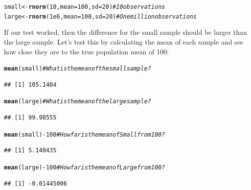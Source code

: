 \documentclass{tufte-book}\usepackage[]{graphicx}\usepackage[]{color}
\makeatletter
\newcommand{\hlnum}[1]{\textcolor[rgb]{0.686,0.059,0.569}{#1}}%
\newcommand{\hlcom}[1]{\textcolor[rgb]{0.678,0.584,0.686}{\textit{#1}}}%
\newcommand{\hlopt}[1]{\textcolor[rgb]{0,0,0}{#1}}%
\newcommand{\hlstd}[1]{\textcolor[rgb]{0.345,0.345,0.345}{#1}}%
\newcommand{\hlkwb}[1]{\textcolor[rgb]{0.69,0.353,0.396}{#1}}%
\newcommand{\hlkwc}[1]{\textcolor[rgb]{0.333,0.667,0.333}{#1}}%
\newcommand{\hlkwd}[1]{\textcolor[rgb]{0.737,0.353,0.396}{\textbf{#1}}}%
\newenvironment{kframe}{%
 \def\at@end@of@kframe{}%
 \ifinner\ifhmode%
  \def\at@end@of@kframe{\end{minipage}}%
  \begin{minipage}{\columnwidth}%
 \fi\fi%
 \def\FrameCommand##1{\hskip\@totalleftmargin \hskip-\fboxsep
 \colorbox{shadecolor}{##1}\hskip-\fboxsep
     \hskip-\linewidth \hskip-\@totalleftmargin \hskip\columnwidth}%
 \MakeFramed {\advance\hsize-\width
   \@totalleftmargin\z@ \linewidth\hsize
   \@setminipage}}%
 {\par\unskip\endMakeFramed%
 \at@end@of@kframe}
\newenvironment{knitrout}{}{} %
\makeatother
\begin{document}

\begin{footnotesize}
\begin{knitrout}
\color{fgcolor}\begin{kframe}
\begin{alltt}
\hlstd{small} \hlkwb{<-} \hlkwd{rnorm}\hlstd{(}\hlnum{10}\hlstd{,} \hlkwc{mean} \hlstd{=} \hlnum{100}\hlstd{,} \hlkwc{sd} \hlstd{=} \hlnum{20}\hlstd{)} \hlcom{# 10 observations}
\hlstd{large} \hlkwb{<-} \hlkwd{rnorm}\hlstd{(}\hlnum{1e6}\hlstd{,} \hlkwc{mean} \hlstd{=} \hlnum{100}\hlstd{,} \hlkwc{sd} \hlstd{=} \hlnum{20}\hlstd{)} \hlcom{# One million observations}
\end{alltt}
\end{kframe}
\end{knitrout}
\end{footnotesize}

If our test worked, then the difference for the small sample should be larger than the large sample. Let's test this by calculating the mean of each sample and see how close they are to the true population mean of 100:

\begin{footnotesize}
\begin{knitrout}
\color{fgcolor}\begin{kframe}
\begin{alltt}
\hlkwd{mean}\hlstd{(small)} \hlcom{# What is the mean of the small sample?}
\end{alltt}
\begin{verbatim}
## [1] 105.1404
\end{verbatim}
\begin{alltt}
\hlkwd{mean}\hlstd{(large)} \hlcom{# What is the mean of the large sample?}
\end{alltt}
\begin{verbatim}
## [1] 99.98555
\end{verbatim}
\begin{alltt}
\hlkwd{mean}\hlstd{(small)} \hlopt{-} \hlnum{100} \hlcom{# How far is the mean of Small from 100?}
\end{alltt}
\begin{verbatim}
## [1] 5.140435
\end{verbatim}
\begin{alltt}
\hlkwd{mean}\hlstd{(large)} \hlopt{-} \hlnum{100} \hlcom{# How far is the mean of Large from 100?}
\end{alltt}
\begin{verbatim}
## [1] -0.01445006
\end{verbatim}
\end{kframe}
\end{knitrout}
\end{footnotesize}
\end{document}

